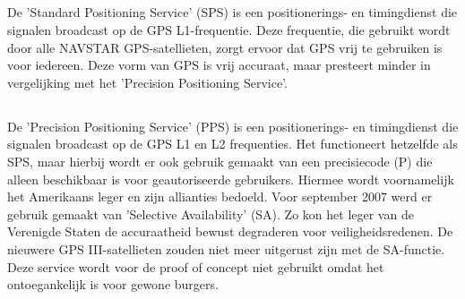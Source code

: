 \subsection{}
De 'Standard Positioning Service' (SPS) is een positionerings- en timingdienst die signalen broadcast op de GPS L1-frequentie. Deze frequentie, die gebruikt wordt door alle NAVSTAR GPS-satellieten, zorgt ervoor dat GPS vrij te gebruiken is voor iedereen. \autocite{gps}
\newline
Deze vorm van GPS is vrij accuraat, maar presteert minder in vergelijking met het 'Precision Positioning Service'. 
\subsection{}
De 'Precision Positioning Service' (PPS) is een  positionerings- en timingdienst die signalen broadcast op de GPS L1 en L2 frequenties. Het functioneert hetzelfde als SPS, maar hierbij wordt er ook gebruik gemaakt van een precisiecode (P) die alleen beschikbaar is voor geautoriseerde gebruikers. Hiermee wordt voornamelijk het Amerikaans leger en zijn allianties bedoeld. \autocite{pps} Voor september 2007 werd er gebruik gemaakt van 'Selective Availability' (SA). Zo kon het leger van de Verenigde Staten de accuraatheid bewust degraderen voor veiligheidsredenen. De nieuwere GPS III-satellieten zouden niet meer uitgerust zijn met de SA-functie. 
\newline
Deze service wordt voor de proof of concept niet gebruikt omdat het  ontoegankelijk is voor gewone burgers.
